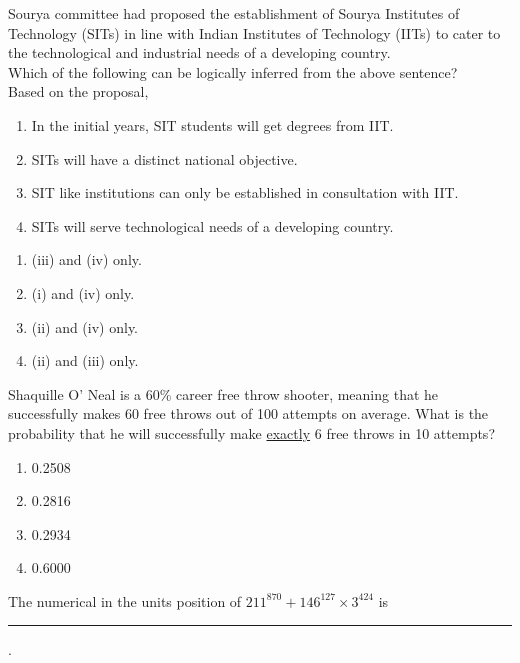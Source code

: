 \item Sourya committee had proposed the establishment of Sourya Institutes of Technology (SITs) in line with Indian Institutes of Technology (IITs) to cater to the technological and industrial needs of a developing country. \\
Which of the following can be logically inferred from the above sentence?\\
Based on the proposal,
\begin{enumerate}[label = (\roman*)]
    \item In the initial years, SIT students will get degrees from IIT.
    \item SITs will have a distinct national objective.
    \item SIT like institutions can only be established in consultation with IIT.
    \item SITs will serve technological needs of a developing country.
\end{enumerate}
\begin{multicols}{2}
    \begin{enumerate}
        \item (iii) and (iv) only.
        \item (i) and (iv) only. 
        \item (ii) and (iv) only. 
        \item (ii) and (iii) only. 
    \end{enumerate}
\end{multicols}

\item Shaquille O' Neal is a 60\% career free throw shooter, meaning that he successfully makes 60 free throws out of 100 attempts on average. What is the probability that he will successfully make \underline{exactly} 6 free throws in 10 attempts? 
\begin{multicols}{2}
    \begin{enumerate}
        \item 0.2508
        \item 0.2816
        \item 0.2934
        \item 0.6000
    \end{enumerate}
\end{multicols}

\item The numerical in the units position of $211^{870} + 146^{127} \times 3^{424}$ is \rule{1cm}{0.15mm} .
